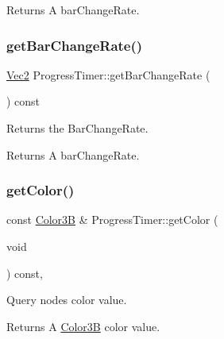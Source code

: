 \begin{DoxyReturn}{Returns}
A bar\+Change\+Rate. 
\end{DoxyReturn}
\mbox{\label{classProgressTimer_a0f3e761df2dca3294dab8e553e19adfa}} 
\subsubsection{\texorpdfstring{get\+Bar\+Change\+Rate()}{getBarChangeRate()}\hspace{0.1cm}{\footnotesize\ttfamily [2/2]}}
{\footnotesize\ttfamily \hyperlink{classVec2}{Vec2} Progress\+Timer\+::get\+Bar\+Change\+Rate (\begin{DoxyParamCaption}{ }\end{DoxyParamCaption}) const\hspace{0.3cm}{\ttfamily [inline]}}

Returns the Bar\+Change\+Rate.

\begin{DoxyReturn}{Returns}
A bar\+Change\+Rate. 
\end{DoxyReturn}
\mbox{\label{classProgressTimer_acf6cb8de15ca3e8954c05a64adec8402}} 
\subsubsection{\texorpdfstring{get\+Color()}{getColor()}\hspace{0.1cm}{\footnotesize\ttfamily [1/2]}}
{\footnotesize\ttfamily const \hyperlink{structColor3B}{Color3B} \& Progress\+Timer\+::get\+Color (\begin{DoxyParamCaption}\item[{void}]{ }\end{DoxyParamCaption}) const\hspace{0.3cm}{\ttfamily [override]}, {\ttfamily [virtual]}}

Query node\textquotesingle{}s color value. \begin{DoxyReturn}{Returns}
A \hyperlink{structColor3B}{Color3B} color value. 
\end{DoxyReturn}


